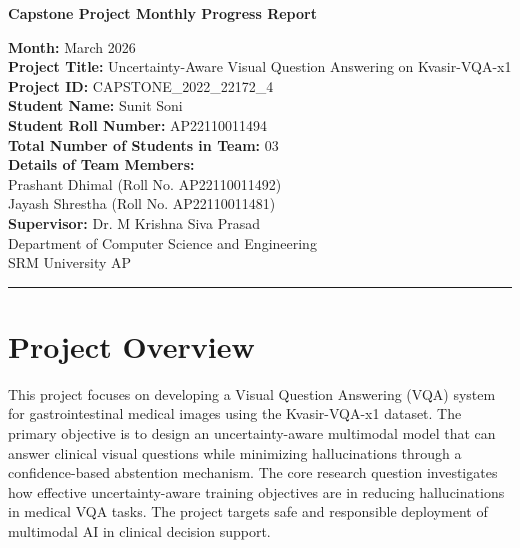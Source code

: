 \documentclass[12pt,a4paper]{article}
\begin{document}
\begin{center}
    \Large \textbf{Capstone Project Monthly Progress Report}\\[0.5cm]
    \normalsize
    
    \textbf{Month:} March 2026 \\[0.5cm]
    \textbf{Project Title:} Uncertainty-Aware Visual Question Answering on Kvasir-VQA-x1 \\[0.5cm]
    \textbf{Project ID:} CAPSTONE\_2022\_22172\_4 \\[0.5cm]
    \textbf{Student Name:} Sunit Soni \\
    \textbf{Student Roll Number:} AP22110011494 \\

    \textbf{Total Number of Students in Team:} 03 \\
    \textbf{Details of Team Members:}\\
       Prashant Dhimal (Roll No. AP22110011492)\\
       Jayash Shrestha (Roll No. AP22110011481)\\[0.5cm]
    \textbf{Supervisor:} Dr. M Krishna Siva Prasad \\[0.5cm]
    Department of Computer Science and Engineering\\
    SRM University AP
\end{center}

\hrule
\vspace{1cm}

\section{Project Overview}
This project focuses on developing a Visual Question Answering (VQA) system for gastrointestinal medical images using the Kvasir-VQA-x1 dataset. The primary objective is to design an uncertainty-aware multimodal model that can answer clinical visual questions while minimizing hallucinations through a confidence-based abstention mechanism. The core research question investigates how effective uncertainty-aware training objectives are in reducing hallucinations in medical VQA tasks. The project targets safe and responsible deployment of multimodal AI in clinical decision support.
\end{document}

